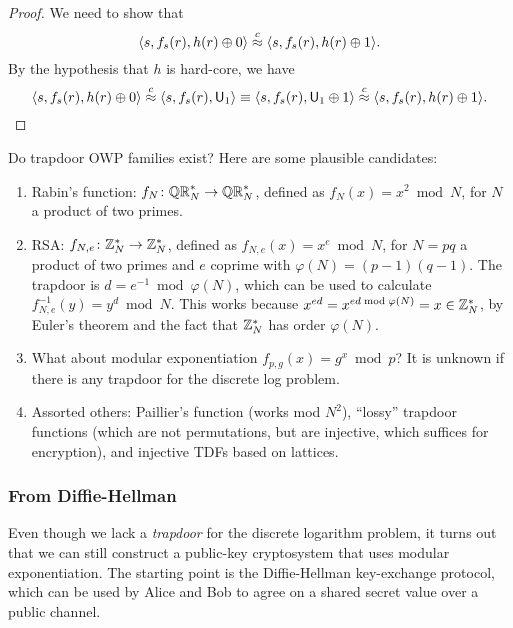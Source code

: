 \documentclass[11pt]{article}
\begin{document}
\begin{proof}
  We need to show that \[ \langle s, f_{s}(r), h(r) \oplus 0 \rangle
  \stackrel{c}{\approx} \langle s, f_{s}(r), h(r) \oplus 1 \rangle. \] By the
  hypothesis that $h$ is hard-core, we have \[ \langle s, f_{s}(r),
  h(r) \oplus 0 \rangle \stackrel{c}{\approx} \langle s, f_{s}(r), \mathsf{U}_{1}
  \rangle \equiv \langle s, f_{s}(r), \mathsf{U}_{1} \oplus 1 \rangle
  \stackrel{c}{\approx} \langle s, f_{s}(r), h(r) \oplus 1 \rangle. \qedhere \]
\end{proof}

Do trapdoor OWP families exist?  Here are some plausible candidates:
\begin{enumerate}

\item Rabin's function: $f_{N} \colon \mathbb{QR}_{N}^{*} \to \mathbb{QR}_{N}^{*}$,
  defined as $f_{N}(x) = x^{2} \bmod N$, for $N$ a product of two
  primes.

\item RSA: $f_{N,e} \colon \mathbb{Z}_N^{*} \to \mathbb{Z}_N^{*}$, defined as $f_{N,
    e}(x) = x^{e} \bmod N$, for $N = pq$ a product of two primes and
  $e$ coprime with $\varphi(N) = (p-1)(q-1)$.  The trapdoor is $d =
  e^{-1} \bmod \varphi(N)$, which can be used to calculate $f_{N,
    e}^{-1}(y) = y^{d} \bmod N$.  This works because $x^{ed} = x^{ed
    \bmod \varphi(N)} = x \in \mathbb{Z}_N^{*}$, by Euler's theorem and the
  fact that $\mathbb{Z}_N^{*}$ has order $\varphi(N)$.

\item What about modular exponentiation $f_{p,g}(x) = g^{x} \bmod p$?
  It is unknown if there is any trapdoor for the discrete log problem.

\item Assorted others: Paillier's function (works mod $N^{2}$),
  ``lossy'' trapdoor functions (which are not permutations, but are
  injective, which suffices for encryption), and injective TDFs based
  on lattices.
\end{enumerate}

\subsubsection{From Diffie-Hellman}
\label{sec:from-diffie-hellman}

Even though we lack a \emph{trapdoor} for the discrete logarithm
problem, it turns out that we can still construct a public-key
cryptosystem that uses modular exponentiation.  The starting point is
the Diffie-Hellman key-exchange protocol, which can be used by Alice
and Bob to agree on a shared secret value over a public channel.
\end{document}
